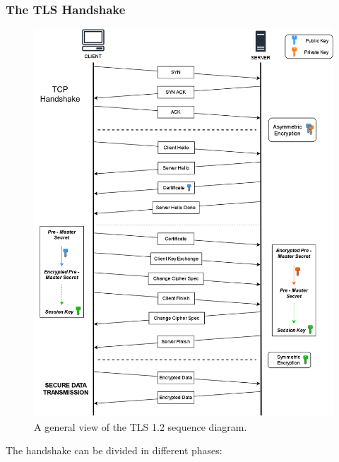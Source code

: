 \documentclass[target=bach,aauheader=,style=]{thud}
\begin{document}
\subsubsection{The TLS Handshake}
\begin{figure}[h!]
	\centering
	\includegraphics[scale=0.4]{tls_finale} %
	\caption{A general view of the TLS 1.2 sequence diagram.}
	\label{fig:tls}
\end{figure}
\newpage
The handshake can be divided in different phases:
\end{document}
